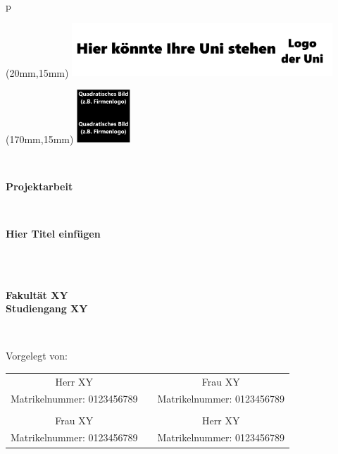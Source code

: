 \begin{center}
\begin{tabular}{p{\textwidth}}

\begin{textblock*}{40mm}(20mm,15mm)
\includegraphics[height=2cm]{images/UNI_Logo.png}
\end{textblock*}

\begin{textblock*}{25mm}(170mm,15mm)
\includegraphics[height=2cm]{images/Quadrat.png}
\end{textblock*}
\\
\vspace*{1cm}

\begin{center}
\LARGE{\textbf{
Projektarbeit}}
\end{center}
\\

\begin{center}
\LARGE{\textbf{
Hier Titel einfügen}}
\end{center}
\\

\\
\begin{center}
\large{\textbf{Fakultät XY\\ \vspace{2mm} Studiengang XY}} 
\end{center}
\\

\begin{center}
\large Vorgelegt von:
\end{center}

\begin{table}[H]
\centering
\begin{tabular}{ccc}
\large Herr XY                    &  & \large Frau XY                    \\
\large Matrikelnummer: 0123456789 &  & \large Matrikelnummer: 0123456789 \\
\\ 
\large Frau XY                    &  & \large Herr XY                    \\
\large Matrikelnummer: 0123456789 &  & \large Matrikelnummer: 0123456789
\end{tabular}
\end{table}


\end{tabular}
\end{center}
